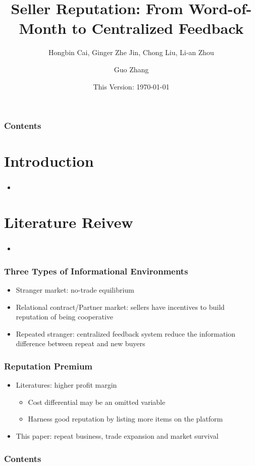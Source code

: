 \documentclass{beamer}
\title{Seller Reputation: From Word-of-Month to Centralized Feedback}
\subtitle{Hongbin Cai, Ginger Zhe Jin, Chong Liu, Li-an Zhou}
\author{Guo Zhang}
\institute{WISE, Xiamen University}
\date{This Version: \today}
\begin{document}
\begin{frame}
\maketitle
\end{frame}

\begin{frame}[plain]
\frametitle{Contents}
\tableofcontents[hideallsubsections]
\end{frame}

\section{Introduction}
\begin{frame}
\frametitle{}
\begin{itemize}
\item 
\end{itemize}
\end{frame}

\section{}

\section{Literature Reivew}
\begin{frame}
\frametitle{}
\begin{itemize}
\item 
\end{itemize}
\end{frame}

\begin{frame}
\frametitle{Three Types of Informational Environments}
\begin{itemize}
\item Stranger market: no-trade equilibrium
\item Relational contract/Partner market: sellers have incentives to build reputation of being cooperative
\item Repeated stranger: centralized feedback system reduce the information difference between repeat and new buyers
\end{itemize}
\end{frame}

\begin{frame}
\frametitle{Reputation Premium}
\begin{itemize}
\item Literatures: higher profit margin
  \begin{itemize}
  \item Cost differential may be an omitted variable
  \item Harness good reputation by listing more items on the platform
  \end{itemize}
 \item This paper: repeat business, trade expansion and market survival
 \end{itemize}
\end{frame}

\begin{frame}[plain]
\frametitle{Contents}
\tableofcontents[hideallsubsections]
\end{frame}
\end{document}
